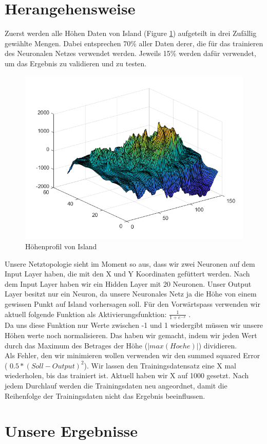 \documentclass{hbrs-ecta-report}
\begin{document}
\section{Herangehensweise}
 Zuerst werden alle Höhen Daten von Island (Figure \ref{fig:island}) aufgeteilt in drei Zufällig gewählte Mengen. Dabei entsprechen 70\% aller Daten derer, die für das trainieren des Neuronalen Netzes verwendet werden. Jeweils 15\% werden dafür verwendet, um das Ergebnis zu validieren und zu testen. 
\begin{figure}[h!]
	\includegraphics[width=\linewidth]{img/island}
	\caption{Höhenprofil von Island}
	\label{fig:island}
\end{figure}

Unsere Netztopologie sieht im Moment so aus, dass wir zwei Neuronen auf dem Input Layer haben, die mit den X und Y Koordinaten gefüttert werden. Nach dem Input Layer haben wir ein Hidden Layer mit 20 Neuronen. Unser Output Layer besitzt nur ein Neuron, da unsere Neuronales Netz ja die Höhe von einem gewissen Punkt auf Island vorhersagen soll.
Für den Vorwärtspass verwenden wir aktuell folgende Funktion als Aktivierungsfunktion: $\frac{1}{1+e^{-x}}$ .\\
Da uns diese Funktion nur Werte zwischen -1 und 1 wiedergibt müssen wir unsere Höhen werte noch normalisieren. Das haben wir gemacht, indem wir jeden Wert durch das Maximum des Betrages der Höhe ($ |max(Hoehe)| $) dividieren.\\
Als Fehler, den wir minimieren wollen verwenden wir den summed squared Error ( $ 0.5*(Soll-Output)^2 $). Wir lassen den Trainingsdatensatz eine X mal wiederholen, bis das trainiert ist. Aktuell haben wir X auf 1000 gesetzt. Nach jedem Durchlauf werden die Trainingsdaten neu angeordnet, damit die Reihenfolge der Trainingsdaten nicht das Ergebnis beeinflussen.

\section{Unsere Ergebnisse}
\end{document}
